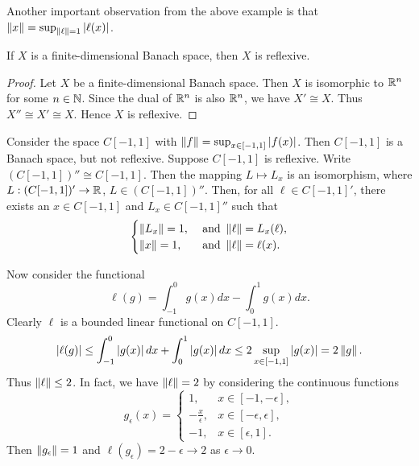 \begin{remark}
    Another important observation from the above example is that 
    $\left\lVert {x} \right\rVert = \sup_{\left\lVert {\ell} \right\rVert = 1}\left\lvert {\ell(x)} \right\rvert$. 
\end{remark}

\begin{proposition}
    If $X$ is a finite-dimensional Banach space, then $X$ is reflexive.
\end{proposition}
\begin{proof}
    Let $X$ be a finite-dimensional Banach space. Then $X$ is 
    isomorphic to $\mathbb{R}^n$ for some $n\in\mathbb{N}$. Since the dual of 
    $\mathbb{R}^n$ is also $\mathbb{R}^n$, we have $X'\cong X$. Thus $X''\cong X'\cong X$. 
    Hence $X$ is reflexive.
\end{proof}

\begin{example}
    Consider the space $C[-1,1]$ with $\left\lVert {f} \right\rVert = \sup_{x\in[-1,1]}\left\lvert {f(x)} \right\rvert$. 
    Then $C[-1,1]$ is a Banach space, but not reflexive. Suppose 
    $C[-1,1]$ is reflexive. Write $(C[-1,1])'' \cong C[-1,1]$. Then 
    the mapping $L\mapsto L_x$ is an isomorphism, where 
    $L:(C[-1,1])'\to\mathbb{R}$, $L\in(C[-1,1])''$. Then, for all $\ell\in C[-1,1]'$, 
    there exists an $x\in C[-1,1]$ and $L_x\in C[-1,1]''$ such that 
    \begin{equation*}
        \begin{cases}
            \left\lVert {L_x} \right\rVert = 1, &\text{ and } \left\lVert {\ell} \right\rVert = L_x(\ell), \\
            \left\lVert {x} \right\rVert = 1, &\text{ and } \left\lVert {\ell} \right\rVert = \ell(x).
        \end{cases}
    \end{equation*}
    
    Now consider the functional 
    \begin{equation*}
        \ell(g) = \int_{-1}^0 g(x)dx - \int_0^1 g(x)dx.
    \end{equation*}
    Clearly $\ell$ is a bounded linear functional on $C[-1,1]$. 
    \begin{equation*}
        \left\lvert {\ell(g)} \right\rvert \leq \int_{-1}^0 \left\lvert {g(x)} \right\rvert dx + \int_0^1 \left\lvert {g(x)} \right\rvert dx 
        \leq 2\sup_{x\in[-1,1]}\left\lvert {g(x)} \right\rvert = 2\left\lVert {g} \right\rVert.
    \end{equation*}
    Thus $\left\lVert {\ell} \right\rVert \leq 2$. In fact, we have $\left\lVert {\ell} \right\rVert = 2$ by considering 
    the continuous functions 
    \begin{equation*}
        g_\epsilon(x) = \begin{cases}
            1, & x\in[-1,-\epsilon], \\
            -\frac{x}{\epsilon}, & x\in[-\epsilon,\epsilon], \\ 
            -1, & x\in[\epsilon,1].
        \end{cases}
    \end{equation*} 
    Then $\left\lVert {g_\epsilon} \right\rVert = 1$ and $\ell(g_\epsilon) = 2-\epsilon\to 2$ 
    as $\epsilon\to 0$. 


\end{example}
